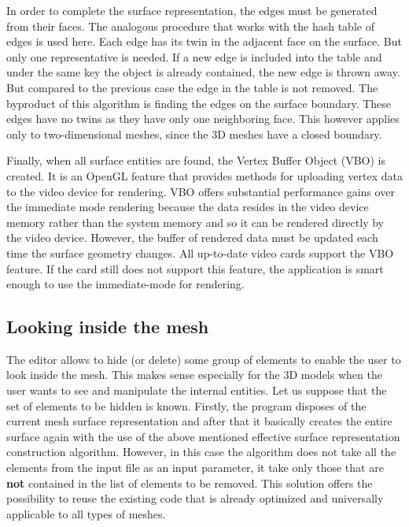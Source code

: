 In order to complete the surface representation, the edges must be generated from their faces. The analogous procedure that works with the hash table of edges is used here. Each edge has its twin in the adjacent face on the surface. But only one representative is needed. If a new edge is included into the table and under the same key the object is already contained, the new edge is thrown away. But compared to the previous case the edge in the table is not removed. The byproduct of this algorithm is finding the edges on the surface boundary. These edges have no twins as they have only one neighboring face. This however applies only to two-dimensional meshes, since the 3D meshes have a closed boundary.

Finally, when all surface entities are found, the Vertex Buffer Object (VBO) is created. It is an OpenGL feature that provides methods for uploading vertex data to the video device for rendering. VBO offers substantial performance gains over the immediate mode rendering because the data resides in the video device memory rather than the system memory and so it can be rendered directly by the video device. However, the buffer of rendered data must be updated each time the surface geometry changes. All up-to-date video cards support the VBO feature. If the card still does not support this feature, the application is smart enough to use the immediate-mode for rendering.


\subsection{Looking inside the mesh}

The editor allows to hide (or delete) some group of elements to enable the user to look inside the mesh. This makes sense especially for the 3D models when the user wants to see and manipulate the internal entities. Let us suppose that the set of elements to be hidden is known. Firstly, the program disposes of the current mesh surface representation and after that it basically creates the entire surface again with the use of the above mentioned effective surface representation construction algorithm. However, in this case the algorithm does not take all the elements from the input file as an input parameter, it take only those that are \textbf{not} contained in the list of elements to be removed. This solution offers the possibility to reuse the existing code that is already optimized and universally applicable to all types of meshes.

